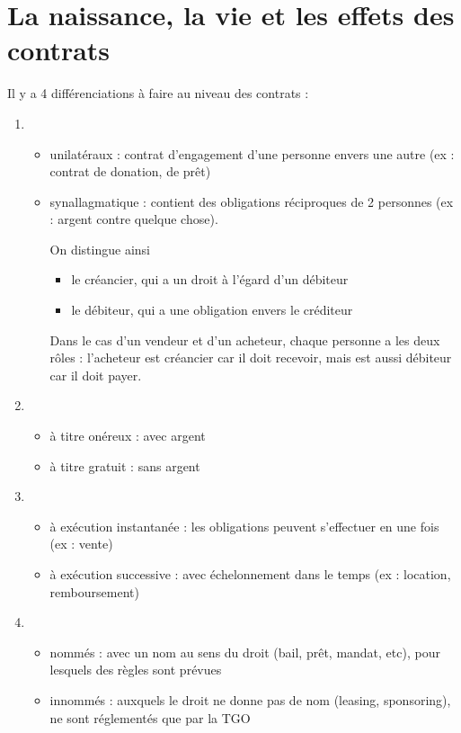 \chapter{La naissance, la vie et les effets des contrats}

Il y a 4 différenciations à faire au niveau des contrats :


\begin{enumerate}
	\item 
	\begin{itemize}
		\item unilatéraux : contrat d'engagement d'une personne envers une autre (ex : contrat de donation, de prêt)
		\item synallagmatique : contient des obligations réciproques de 2 personnes (ex : argent contre quelque chose).
		
		On distingue ainsi
		
		
		
		\begin{itemize}
			\item le créancier, qui a un droit à l'égard d'un débiteur
			\item le débiteur, qui a une obligation envers le créditeur
		\end{itemize}
		
		Dans le cas d'un vendeur et d'un acheteur, chaque personne a les deux rôles : l'acheteur est créancier car il doit recevoir, mais est aussi débiteur car il doit payer.
		
	\end{itemize}
	
	\item 
	\begin{itemize}
		\item à titre onéreux : avec argent
		\item à titre gratuit : sans argent
	\end{itemize}
	
	\item 
	\begin{itemize}
		\item à exécution instantanée : les obligations peuvent s'effectuer en une fois (ex : vente)
		\item à exécution successive : avec échelonnement dans le temps (ex : location, remboursement)
	\end{itemize}
	
	\item 
	\begin{itemize}
		\item nommés : avec un nom au sens du droit (bail, prêt, mandat, etc), pour lesquels des règles sont prévues
		\item innommés : auxquels le droit ne donne pas de nom (leasing, sponsoring), ne sont réglementés que par la TGO 
	\end{itemize}
\end{enumerate}



